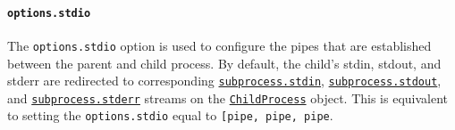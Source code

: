 \begin{Shaded}
\begin{Highlighting}[]
\OperatorTok{=} \NormalTok{(}\NormalTok{)}\OperatorTok{;}
\OperatorTok{=} \NormalTok{(}\NormalTok{)}\OperatorTok{;}
\OperatorTok{=}\NormalTok{(}\OperatorTok{,} \NormalTok{)}\OperatorTok{;}
\OperatorTok{=}\NormalTok{(}\OperatorTok{,} \NormalTok{)}\OperatorTok{;}

\OperatorTok{=} \NormalTok{(}\OperatorTok{,}\NormalTok{ []}\OperatorTok{,}\NormalTok{ \{}
  \OperatorTok{:} \OperatorTok{,}
  \OperatorTok{:}\NormalTok{ [ }\OperatorTok{,}\OperatorTok{,}\NormalTok{ err ]}\OperatorTok{,}
\NormalTok{\})}\OperatorTok{;}

\NormalTok{()}\OperatorTok{;}
\end{Highlighting}
\end{Shaded}

\paragraph{\texorpdfstring{\texttt{options.stdio}}{options.stdio}}\label{options.stdio}

The \texttt{options.stdio} option is used to configure the pipes that
are established between the parent and child process. By default, the
child's stdin, stdout, and stderr are redirected to corresponding
\hyperref[subprocessstdin]{\texttt{subprocess.stdin}},
\hyperref[subprocessstdout]{\texttt{subprocess.stdout}}, and
\hyperref[subprocessstderr]{\texttt{subprocess.stderr}} streams on the
\hyperref[class-childprocess]{\texttt{ChildProcess}} object. This is
equivalent to setting the \texttt{options.stdio} equal to
\texttt{{[}\textquotesingle{}pipe\textquotesingle{},\ \textquotesingle{}pipe\textquotesingle{},\ \textquotesingle{}pipe\textquotesingle{}{]}}.

